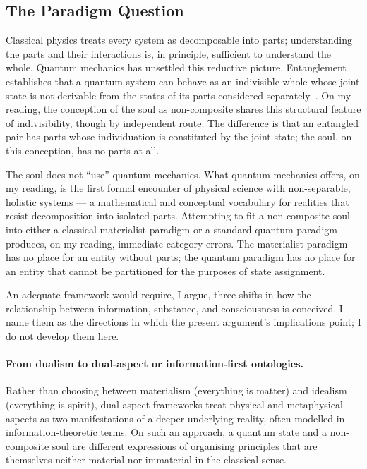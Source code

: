 \subsection{The Paradigm Question}

Classical physics treats every system as decomposable into parts; understanding
the parts and their interactions is, in principle, sufficient to understand the
whole.
Quantum mechanics has unsettled this reductive picture.
Entanglement establishes that a quantum system can behave as an indivisible
whole whose joint state is not derivable from the states of its parts
considered separately~\citep{Bell1964,Rovelli1996}.
On my reading, the \bahai conception of the soul as non-composite shares this
structural feature of indivisibility, though by independent route.
The difference is that an entangled pair has parts whose individuation is
constituted by the joint state; the soul, on this conception, has no parts
at all.

The soul does not ``use'' quantum mechanics.
What quantum mechanics offers, on my reading, is the first formal encounter
of physical science with non-separable, holistic systems --- a mathematical
and conceptual vocabulary for realities that resist decomposition into
isolated parts.
Attempting to fit a non-composite soul into either a classical materialist
paradigm or a standard quantum paradigm produces, on my reading, immediate
category errors.
The materialist paradigm has no place for an entity without parts;
the quantum paradigm has no place for an entity that cannot be partitioned
for the purposes of state assignment.

An adequate framework would require, I argue, three shifts in how the
relationship between information, substance, and consciousness is conceived.
I name them as the directions in which the present argument's implications
point; I do not develop them here.

\paragraph{From dualism to dual-aspect or information-first ontologies.}
Rather than choosing between materialism (everything is matter) and idealism
(everything is spirit), dual-aspect frameworks treat physical and metaphysical
aspects as two manifestations of a deeper underlying reality, often modelled
in information-theoretic terms.
On such an approach, a quantum state and a non-composite soul are different
expressions of organising principles that are themselves neither material nor
immaterial in the classical sense.

